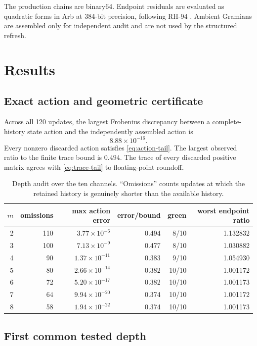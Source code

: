 \documentclass[11pt]{article}
\theoremstyle{definition}
\theoremstyle{remark}
\begin{document}
The production chains are binary64.  Endpoint residuals are evaluated as
quadratic forms in Arb at 384-bit precision, following RH-94
\citep{Rump2010}.  Ambient Gramians are assembled only for independent audit
and are not used by the structured refresh.

\section{Results}
\label{sec:results}

\subsection{Exact action and geometric certificate}

Across all 120 updates, the largest Frobenius discrepancy between a
complete-history state action and the independently assembled action is
\[
 8.88\times10^{-16}.
\]
Every nonzero discarded action satisfies \eqref{eq:action-tail}.  The largest
observed ratio to the finite trace bound is $0.494$.  The trace of every
discarded positive matrix agrees with \eqref{eq:trace-tail} to floating-point
roundoff.

\begin{table}[t]
\centering
\caption{Depth audit over the ten channels.  ``Omissions'' counts updates at
which the retained history is genuinely shorter than the available history.}
\label{tab:depth}
\begin{tabular}{@{}rrrrrr@{}}
\toprule
$m$ & omissions & max action error & error/bound & green & worst endpoint ratio\\
\midrule
2 & 110 & $3.77\times10^{-6}$  & 0.494 & 8/10  & 1.132832\\
3 & 100 & $7.13\times10^{-9}$  & 0.477 & 8/10  & 1.030882\\
4 & 90  & $1.37\times10^{-11}$ & 0.383 & 9/10  & 1.054930\\
5 & 80  & $2.66\times10^{-14}$ & 0.382 & 10/10 & 1.001172\\
6 & 72  & $5.20\times10^{-17}$ & 0.382 & 10/10 & 1.001173\\
7 & 64  & $9.94\times10^{-20}$ & 0.374 & 10/10 & 1.001172\\
8 & 58  & $1.94\times10^{-22}$ & 0.374 & 10/10 & 1.001173\\
\bottomrule
\end{tabular}
\end{table}

\subsection{First common tested depth}
\end{document}
